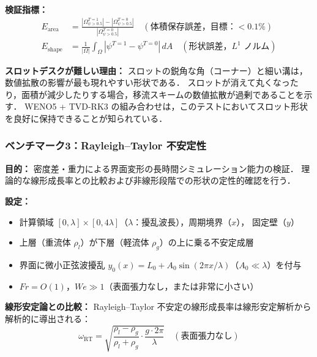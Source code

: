 \textbf{検証指標：}
\begin{align}
  E_{\text{area}} &= \frac{|\Omega_{\psi>0.5}^{T=1}| - |\Omega_{\psi>0.5}^{T=0}|}{|\Omega_{\psi>0.5}^{T=0}|}
  \quad (\text{体積保存誤差，目標：} < 0.1\%) \\
  E_{\text{shape}} &= \frac{1}{|\Omega|}\int_\Omega |\psi^{T=1} - \psi^{T=0}|\,dA
  \quad (\text{形状誤差，$L^1$ ノルム})
\end{align}

\noindent\textbf{スロットデスクが難しい理由：}
スロットの鋭角な角（コーナー）と細い溝は，数値拡散の影響が最も現れやすい形状である．
スロットが消えて丸くなったり，面積が減少したりする場合，移流スキームの数値拡散が過剰であることを示す．
WENO5 + TVD-RK3 の組み合わせは，このテストにおいてスロット形状を良好に保持できることが知られている．

\subsubsection{ベンチマーク3：Rayleigh--Taylor 不安定性}
\label{sec:bench_rt}

\textbf{目的：} 密度差・重力による界面変形の長時間シミュレーション能力の検証．
理論的な線形成長率との比較および非線形段階での形状の定性的確認を行う．

\textbf{設定：}
\begin{itemize}
  \item 計算領域 $[0, \lambda] \times [0, 4\lambda]$（$\lambda$：擾乱波長），周期境界（$x$），
        固定壁（$y$）
  \item 上層（重流体 $\rho_l$）が下層（軽流体 $\rho_g$）の上に乗る不安定成層
  \item 界面に微小正弦波擾乱 $y_0(x) = L_0 + A_0\sin(2\pi x/\lambda)$（$A_0 \ll \lambda$）を付与
  \item $Fr = O(1)$，$We \gg 1$（表面張力なし，または非常に小さい）
\end{itemize}

\textbf{線形安定論との比較：}
Rayleigh--Taylor 不安定の線形成長率は線形安定解析から解析的に導出される：
\begin{equation}
  \omega_{\text{RT}} = \sqrt{\frac{\rho_l - \rho_g}{\rho_l + \rho_g} \cdot \frac{g \cdot 2\pi}{\lambda}}
  \quad (\text{表面張力なし})
  \label{eq:rt_growth}
\end{equation}

